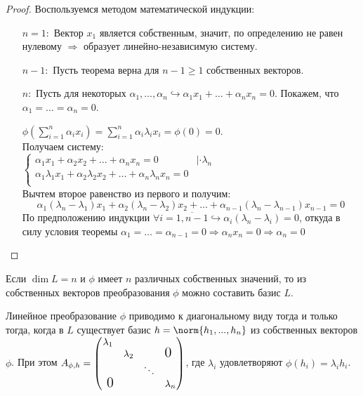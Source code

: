 \begin{proof}
Воспользуемся методом математической индукции:
\linebreak\vspace*{-\baselineskip}
\begin{itemize}
\item[\underline{$n=1:$}] Вектор $x_1$ является собственным, значит, по определению не равен нулевому $\Rightarrow$ образует линейно-независимую систему.
\item[\underline{$n-1:$}] Пусть теорема верна для $n-1\ge 1$ собственных векторов.

\item[\underline{$n:$}] Пусть для некоторых $\alpha_1,\dots,\alpha_n \hookrightarrow \alpha_1 x_1 + \ldots+\alpha_n x_n = 0$. Покажем, что $\alpha_1=\ldots=\alpha_n=0$.

$\phi(\sum_{i=1}^n \alpha_i x_i)=\sum_{i=1}^n \alpha_i \lambda_i x_i = \phi(0)=0$. \\
Получаем систему: \\
$\begin{cases}
\alpha_1 x_1 + \alpha_2 x_2 + \ldots + \alpha_n x_n = 0 & |\cdot \lambda_n \\
\alpha_1 \lambda_1 x_1 + \alpha_2 \lambda_2 x_2 + \ldots + \alpha_n \lambda_n x_n = 0 \\
\end{cases}$ \\
Вычтем второе равенство из первого и получим:
\begin{equation*}
\alpha_1 (\lambda_n-\lambda_1) x_1 + \alpha_2 (\lambda_n-\lambda_2) x_2 + \ldots + \alpha_{n-1} (\lambda_n-\lambda_{n-1}) x_{n-1} = 0
\end{equation*}
По предположению индукции $\forall i=\overline{1,n-1} \hookrightarrow \alpha_i(\lambda_n-\lambda_i)=0$, откуда в силу условия теоремы $\alpha_1=\ldots=\alpha_{n-1}=0 \Rightarrow \alpha_n x_n=0 \Rightarrow \alpha_n=0$
\end{itemize}
\vspace{-1.65\baselineskip}
\end{proof}
\begin{cons}
Если $\dim L = n$ и $\phi$ имеет $n$ различных собственных значений, то из собственных векторов преобразования $\phi$ можно составить базис $L$.
\end{cons}  
\begin{stt}
Линейное преобразование $\phi$ приводимо к диагональному виду тогда и только тогда, когда в $L$ существует базис $ h = \norm{h_1,...,h_n}$ из собственных векторов $\phi$. При этом $A_{\phi,h}=
\begin{pmatrix}
\lambda_1 &           &        & \\
        & \lambda_2 &        & \fudge {0 }  \\
        &			& \ddots & \\
\fudge{ 0}&			&		 & \lambda_n \\
\end{pmatrix}$, где $\lambda_i$ удовлетворяют $\phi(h_i)=\lambda_i h_i$.
\end{stt} 

